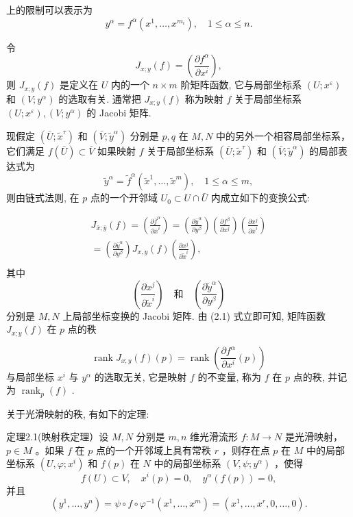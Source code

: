 上的限制可以表示为
$$
y ^ {\alpha} = f ^ {\alpha} \left(x ^ {1}, \dots , x ^ {m _ {i}}\right), \quad 1 \leqslant \alpha \leqslant n.
$$

令
$$
J _ {x; y} (f) = \left(\frac {\partial f ^ {\alpha}}{\partial x ^ {i}}\right),
$$
则  $J_{x;y}(f)$  是定义在  $U$  内的一个  $n \times m$  阶矩阵函数, 它与局部坐标系  $(U; x^{\varepsilon})$  和  $(V; y^{\alpha})$  的选取有关. 通常把  $J_{x;y}(f)$  称为映射  $f$  关于局部坐标系  $(U; x^{\varepsilon}), (V; y^{\alpha})$  的 Jacobi 矩阵.

现假定  $(\bar{U};\tilde{x}^{\tau})$  和  $(\bar{V};\tilde{y}^{\alpha})$  分别是  $p,q$  在  $M,N$  中的另外一个相容局部坐标系，它们满足  $f(\bar{U})\subset \bar{V}$  如果映射  $f$  关于局部坐标系  $(\bar{U};\tilde{x}^{\tau})$  和  $(\bar{V};\tilde{y}^{\alpha})$  的局部表达式为
$$
\tilde {y} ^ {\alpha} = \tilde {f} ^ {\alpha} (\tilde {x} ^ {1}, \dots , \tilde {x} ^ {m}), \quad 1 \leqslant \alpha \leqslant m,
$$
则由链式法则, 在  $p$  点的一个开邻域  $U_{0} \subset U \cap \bar{U}$  内成立如下的变换公式:

$$
\begin{array}{l} J _ {\bar {x}; \bar {y}} (f) = \left(\frac {\partial \bar {f} ^ {\alpha}}{\partial \bar {x} ^ {i}}\right) = \left(\frac {\partial \bar {y} ^ {\alpha}}{\partial y ^ {\beta}}\right) \left(\frac {\partial f ^ {\beta}}{\partial x ^ {j}}\right) \left(\frac {\partial x ^ {j}}{\partial \bar {x} ^ {i}}\right) \\ = \left(\frac {\partial \bar {y} ^ {\alpha}}{\partial y ^ {\beta}}\right) J _ {x, y} (f) \left(\frac {\partial x ^ {j}}{\partial \tilde {x} ^ {i}}\right), %
\\ \end{array}
$$
其中
$$
\left({\frac {\partial x ^ {j}}{\partial \tilde {x} ^ {i}}}\right) \quad {\text {和}} \quad \left({\frac {\partial \tilde {y} ^ {\alpha}}{\partial y ^ {\beta}}}\right)
$$
分别是  $M, N$  上局部坐标变换的 Jacobi 矩阵. 由 (2.1) 式立即可知, 矩阵函数  $J_{x;y}(f)$  在  $p$  点的秩

$$
\operatorname {r a n k} J _ {x; y} (f) (p) = \operatorname {r a n k} \left(\frac {\partial f ^ {\alpha}}{\partial x ^ {i}} (p)\right)
$$
与局部坐标  $x^i$  与  $y^\alpha$  的选取无关, 它是映射  $f$  的不变量, 称为  $f$  在  $p$  点的秩, 并记为  $\operatorname{rank}_p(f)$ .

关于光滑映射的秩, 有如下的定理:

定理2.1(映射秩定理）设  $M, N$  分别是  $m, n$  维光滑流形  $f: M \to N$  是光滑映射， $p \in M$ 。如果  $f$  在  $p$  点的一个开邻域上具有常秩  $r$ ，则存在点  $p$  在  $M$  中的局部坐标系  $(U, \varphi; x^i)$  和  $f(p)$  在  $N$  中的局部坐标系  $(V, \psi; y^\alpha)$ ，使得
$$
f (U) \subset V, \quad x ^ {i} (p) = 0, \quad y ^ {\alpha} (f (p)) = 0,
$$
并且
$$
(y ^ {1}, \dots , y ^ {n}) = \psi \circ f \circ \varphi^ {- 1} (x ^ {1}, \dots , x ^ {m}) = (x ^ {1}, \dots , x ^ {r}, 0, \dots , 0).
$$


